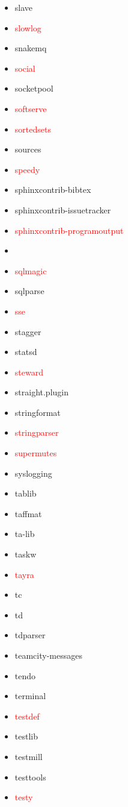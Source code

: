 \documentclass{l4proj}
\begin{document}
\begin{appendices}
{\begin{itemize}
\item slave
\item\textcolor{red}{slowlog}
\item snakemq
\item\textcolor{red}{social}
\item socketpool
\item\textcolor{red}{softserve}
\item\textcolor{red}{sortedsets}
\item sources
\item\textcolor{red}{speedy}
\item sphinxcontrib-bibtex
\item sphinxcontrib-issuetracker
\item\textcolor{red}{sphinxcontrib-programoutput}
\item {}
\item\textcolor{red}{sqlmagic}
\item sqlparse
\end{itemize}
}%
\noindent\parbox[t]{0.32\textwidth}{\raggedright%
\begin{itemize}
\item\textcolor{red}{sse}
\item stagger
\item statsd
\item\textcolor{red}{steward}
\item straight.plugin
\item stringformat
\item\textcolor{red}{stringparser}
\item\textcolor{red}{supermutes}
\item syslogging
\item tablib
\item taffmat
\item ta-lib
\item taskw
\item\textcolor{red}{tayra}
\item tc
\item td
\item tdparser
\item teamcity-messages
\item tendo
\item terminal
\item\textcolor{red}{testdef}
\item testlib
\item testmill
\item testtools
\item\textcolor{red}{testy}

\end{itemize}}
\end{appendices}
\end{document}
